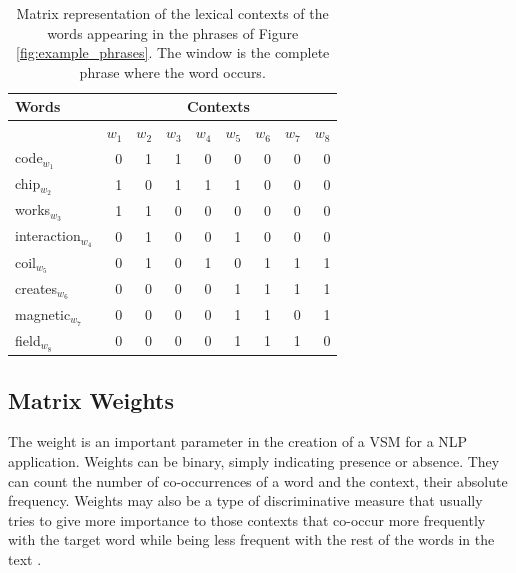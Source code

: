\begin{table}[]
\centering
\caption{Matrix representation of the lexical contexts of the words appearing in the phrases of Figure \ref{fig:example_phrases}. The window is the complete phrase where the word occurs.}
\label{tab:lexical_matrix}
\begin{tabular}{@{}lrrrrrrrr@{}}
\toprule
 Words & \multicolumn{8}{c}{Contexts} \\ \midrule
       & $w_1$ & $w_2$ & $w_3$ & $w_4$ & $w_5$ & $w_6$ & $w_7$ & $w_8$ \\ \midrule
code$_{w_1}$        & 0    & 1    & 1     & 0           & 0    & 0       & 0        & 0     \\
chip$_{w_2}$        & 1    & 0    & 1     & 1           & 1    & 0       & 0        & 0     \\
works$_{w_3}$       & 1    & 1    & 0     & 0           & 0    & 0       & 0        & 0     \\
interaction$_{w_4}$ & 0    & 1    & 0     & 0           & 1    & 0       & 0        & 0     \\
coil$_{w_5}$        & 0    & 1    & 0     & 1           & 0    & 1       & 1        & 1     \\
creates$_{w_6}$     & 0    & 0    & 0     & 0           & 1    & 1       & 1        & 1     \\
magnetic$_{w_7}$    & 0    & 0    & 0     & 0           & 1    & 1       & 0        & 1     \\
field$_{w_8}$       & 0    & 0    & 0     & 0           & 1    & 1       & 1        & 0     \\ \bottomrule
\end{tabular}
\end{table}

\subsection{Matrix Weights}

The weight is an important parameter in the creation of a VSM for a NLP application. Weights can be binary, simply  indicating presence or absence. They can count the number of co-occurrences of a word and the context, their absolute frequency. Weights may also be a type of discriminative measure that usually tries to give more importance to those contexts that co-occur more frequently with the target word while being less frequent  with the rest of the words in the text \cite{JurafskyM09,ClarkBook2010}.  

